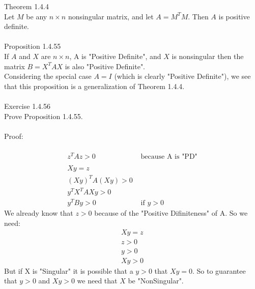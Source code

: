 \documentclass{article}
\begin{document}
	Theorem 1.4.4\\
	Let $M$ be any $n\times n$ nonsingular matrix, and let $A = M^TM$. Then 
	$A$ is positive definite.\\
	\\	
	Proposition 1.4.55\\
	If $A$ and $X$ are $n \times n$, A is "Positive Definite", and $X$ is nonsingular 
	then the matrix $B = X^TAX$ is also "Positive Definite".\\ 
	Considering the special case $A = I$ (which is clearly "Positive Definite"), we see that 
	this proposition is a generalization of Theorem 1.4.4.\\ 
	\\
	Exercise 1.4.56\\
	Prove Proposition 1.4.55.\\
	\\
	Proof:\\
	\\
	\begin{align*}
		z^TAz > 0 & \text { because A is "PD"}\\
		\\
		Xy=z\\
		(Xy)^TA(Xy)>0\\
		y^TX^TAXy>0\\
		y^TBy>0 & \text{ if } y > 0
	\end{align*}
	We already know that $z>0$ because of the "Positive Difiniteness" of A. So we need:
	\begin{align*}
		Xy=z\\
		z>0\\
		y>0\\
		Xy>0
	\end{align*}
	But if X is "Singular" it is possible that a $y>0$ that $Xy=0$. So to guarantee that $y>0$ and $Xy>0$ we need that $X$ be "NonSingular".
\end{document}
